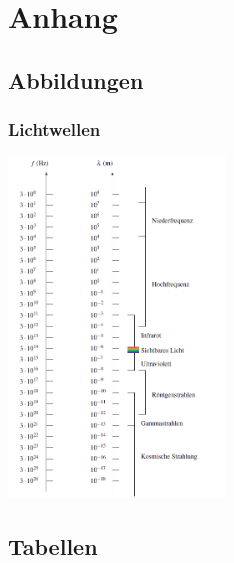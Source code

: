 \section{Anhang}
\subsection{Abbildungen}
\subsubsection{Lichtwellen}
\includegraphics[height=9cm,keepaspectratio=true]{Images/lichtwellen.png}


\subsection{Tabellen}